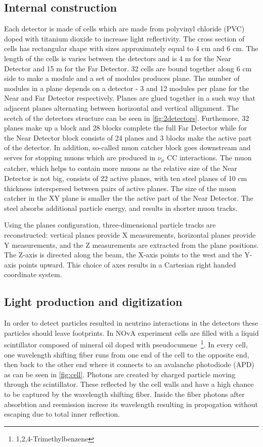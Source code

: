 \subsection{Internal construction}
Each detector is made of cells which are made from polyvinyl chloride (PVC) doped with titanium 
dioxide to increase light reflectivity. The cross section of cells has rectangular shape with sizes
approximately equal to 4 cm and 6 cm. The length of the cells is varies between the detectors and 
is 4 m for the Near Detector and 15 m for the Far Detector. 32 cells are bound together along
6 cm side to make a module and a set of modules produces plane. The number of modules in a plane
depends on a detector - 3 and 12 modules per plane for the Near and Far Detector respectively. Planes
are glued together in a such way that adjacent planes alternating between horizontal and vertical
allignment. The scetch of the detectors structure can be seen in \ref{fig:2detectors}. Furthemore, 32 planes 
make up a block and 28 blocks complete the full Far Detector while for the Near Detector block consists
of 24 planes and 3 blocks make the active part of the detector. In addition, so-called muon catcher
block goes downstream and serves for stopping muons which are produced in $\nu_\mu$ CC interactions. 
The muon catcher, which helps to contain more muons as the relative size of the Near Detector is not big,
consists of 22 active planes, with ten steel planes of 10 cm thickness interspersed between pairs of active 
planes. The size of the muon catcher in the XY plane is smaller the the active part of the Near Detector. 
The steel absorbs additional particle energy, and results in shorter muon tracks.

Using the planes configuration, three-dimensional particle tracks are reconstructed: vertical planes
provide X measurements, horizontal planes provide Y measurements, and the Z measurements are extracted from
the plane positions. The Z-axis is directed along the beam, the X-axis points to the west and the Y-axis points
upward. This choice of axes results in a Cartesian right handed coordinate system.

\subsection{Light production and digitization}
In order to detect particles resulted in neutrino interactions in the detectors these particles 
should leave footprints. In NOvA experiment cells are filled with a liquid scintillator composed 
of mineral oil doped with pseudocumene~\footnote{1,2,4-Trimethylbenzene}. In every cell, one wavelength 
shifting fiber runs from one end of the cell to the opposite end, then back to the other end where 
it connects to an avalanche photodiode (APD) as can be seen in \ref{fig:cell}. Photons are created by charged 
particle moving through the scintillator. These reflected by the cell walls and have a high chance 
to be captured by the wavelength shifting fiber. Inside the fiber photons after absorbtion and
reemission increse its wavelength resulting in propogation without escaping due to total inner
reflection. 

